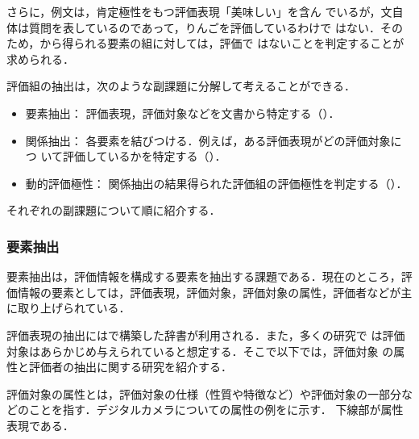 さらに，例文は，肯定極性をもつ評価表現「美味しい」を含ん
でいるが，文自体は質問を表しているのであって，りんごを評価しているわけで
はない．そのため，から得られる要素の組に対しては，評価で
はないことを判定することが求められる．


評価組の抽出は，次のような副課題に分解して考えることができる．

\begin{itemize}
 \item 要素抽出：
評価表現，評価対象などを文書から特定する（）．

 \item 関係抽出：
各要素を結びつける．例えば，ある評価表現がどの評価対象につ
いて評価しているかを特定する（）．

 \item 動的評価極性：
関係抽出の結果得られた評価組の評価極性を判定する（）．

\end{itemize}

それぞれの副課題について順に紹介する．

\subsubsection{要素抽出}
\label{sec:elem_ext}

要素抽出は，評価情報を構成する要素を抽出する課題である．現在のところ，評
価情報の要素としては，評価表現，評価対象，評価対象の属性，評価者などが主
に取り上げられている．

評価表現の抽出にはで構築した辞書が利用される．また，多くの研究で
は評価対象はあらかじめ与えられていると想定する．そこで以下では，評価対象
の属性と評価者の抽出に関する研究を紹介する．

\label{sec:attr}

評価対象の属性とは，評価対象の仕様（性質や特徴など）や評価対象の一部分な
どのことを指す．デジタルカメラについての属性の例をに示す．
下線部が属性表現である．


